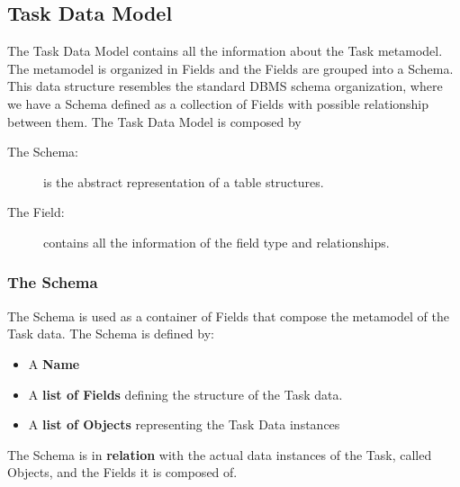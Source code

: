 \subsection{Task Data Model}\label{data:model}
The Task Data Model contains all the information about the Task metamodel. The
metamodel is organized in Fields and the Fields are grouped into a Schema. This
data structure resembles the standard DBMS schema organization, where we have
a Schema defined as a collection of Fields with possible relationship between
them. The Task Data Model is composed by
\begin{description}
    \item[The Schema:] is the abstract representation of a table structures.
    \item[The Field:] contains all the information of the field type and
    relationships.
\end{description}


\subsubsection{The Schema}
The Schema is used as a container of Fields that compose the metamodel of the
Task data. The Schema is defined by:
\begin{itemize}
    \item A \textbf{Name}

    \item A \textbf{list of Fields} defining the structure of the Task data.

    \item A \textbf{list of Objects} representing the Task Data instances
\end{itemize}

The Schema is in \textbf{relation} with the actual data instances of the Task,
called Objects, and the Fields it is composed of.


